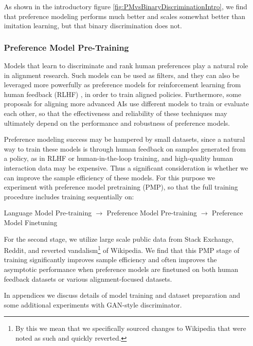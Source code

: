 As shown in the introductory figure \ref{fig:PMvsBinaryDiscriminationIntro}, we find that preference modeling performs much better and scales somewhat better than imitation learning, but that binary discrimination does not.  

\subsubsection*{Preference Model Pre-Training}

Models that learn to discriminate and rank human preferences play a natural role in alignment research.  Such models can be used as filters, and they can also be leveraged more powerfully as preference models for reinforcement learning from human feedback (RLHF) \cite{christiano2017deep}, in order to train aligned policies.  Furthermore, some proposals \cite{christiano2018supervising, irving2018ai} for aligning more advanced AIs use different models to train or evaluate each other, so that the effectiveness and reliability of these techniques may ultimately depend on the performance and robustness of preference models. 

Preference modeling success may be hampered by small datasets, since a natural way to train these models is through human feedback on samples generated from a policy, as in RLHF or human-in-the-loop training, and high-quality human interaction data may be expensive.  Thus a significant consideration is whether we can improve the sample efficiency of these models.  For this purpose we experiment with preference model pretraining (PMP), so that the full training procedure includes training sequentially on:

\begin{center}
{ Language Model Pre-training $\to$ Preference Model Pre-training $\to$ Preference Model Finetuning}
\end{center}

For the second stage, we utilize  large scale public data from Stack Exchange, Reddit, and reverted vandalism\footnote{By this we mean that we specifically sourced changes to Wikipedia that were noted as such and quickly reverted.} of Wikipedia.  We find that this PMP stage of training significantly improves  sample efficiency and often improves the asymptotic performance when preference models are finetuned on both human feedback datasets or various alignment-focused datasets.  

In appendices we discuss details of model training and dataset preparation and some additional experiments with GAN-style discriminator.

